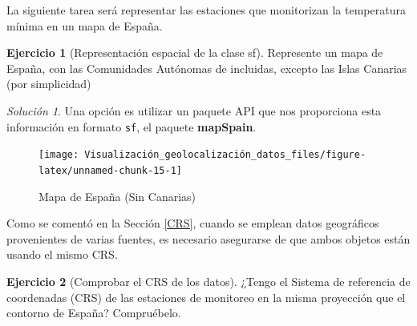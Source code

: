 \documentclass[
]{book}
\newenvironment{Shaded}{\begin{snugshade}}{\end{snugshade}}
\newcommand{\CommentTok}[1]{\textcolor[rgb]{0.56,0.35,0.01}{\textit{#1}}}
\newcommand{\FunctionTok}[1]{\textcolor[rgb]{0.00,0.00,0.00}{#1}}
\newcommand{\NormalTok}[1]{#1}
\newcommand{\OtherTok}[1]{\textcolor[rgb]{0.56,0.35,0.01}{#1}}
\newcommand{\SpecialCharTok}[1]{\textcolor[rgb]{0.00,0.00,0.00}{#1}}
\newcommand{\StringTok}[1]{\textcolor[rgb]{0.31,0.60,0.02}{#1}}
\theoremstyle{definition}
\theoremstyle{definition}
\theoremstyle{definition}
\newtheorem{exercise}{Ejercicio}[chapter]
\theoremstyle{definition}
\theoremstyle{remark}
\newtheorem*{solution}{Solución}
\begin{document}
La siguiente tarea será representar las estaciones que monitorizan la
temperatura mínima en un mapa de España.

\begin{exercise}[Representación espacial de la clase sf]
\protect\hypertarget{exr:ex6}{}\label{exr:ex6}Represente un mapa de España, con las Comunidades Autónomas de incluidas,
excepto las Islas Canarias (por simplicidad)
\end{exercise}

\begin{solution}
Una opción es utilizar un paquete API que nos proporciona esta información en
formato \texttt{sf}, el paquete \textbf{mapSpain}.
\end{solution}

\begin{Shaded}
\end{Shaded}

\begin{figure}

{\centering \texttt{[image: Visualización\_geolocalización\_datos\_files/figure-latex/unnamed-chunk-15-1]} 

}

\caption{Mapa de España (Sin Canarias)}\label{fig:unnamed-chunk-15}
\end{figure}

Como se comentó en la Sección \ref{CRS}, cuando se emplean datos geográficos
provenientes de varias fuentes, es necesario asegurarse de que ambos objetos
están usando el mismo CRS.

\begin{exercise}[Comprobar el CRS de los datos]
\protect\hypertarget{exr:ex7}{}\label{exr:ex7}¿Tengo el Sistema de referencia de coordenadas (CRS) de las estaciones de
monitoreo en la misma proyección que el contorno de España? Compruébelo.
\end{exercise}
\end{document}
